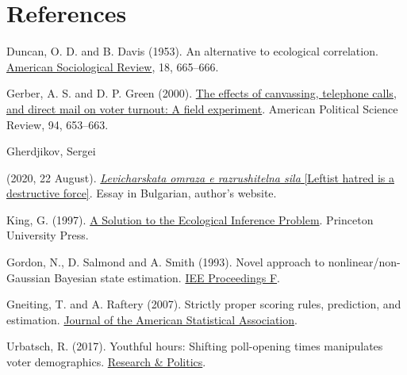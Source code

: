 \documentclass[11pt,a4paper]{article}
\begin{document}
\section*{References}
\begingroup\setlength{\parindent}{0pt}
Duncan, O. D. and B. Davis (1953). An alternative to ecological correlation. \href{https://doi.org/10.2307/2088122}{American Sociological Review}, 18, 665--666.\par
Gerber, A. S. and D. P. Green (2000). \href{https://isps.yale.edu/resource/the-effects-of-canvassing-telephone-calls-and-direct-mail-on-voter-turnout-a-field}{The effects of canvassing, telephone calls, and direct mail on voter turnout: A field experiment}. American Political Science Review, 94, 653--663.\par
\hypertarget{ref-gherdjikov}{Gherdjikov, Sergei} (2020, 22 August). \href{https://www.gherdjikov.com/levicharskata-omraza-e-razrushitelna-sila/}{\textit{Levicharskata omraza e razrushitelna sila} [Leftist hatred is a destructive force]}. Essay in Bulgarian, author's website.\par
King, G. (1997). \href{https://gking.harvard.edu/ei}{A Solution to the Ecological Inference Problem}. Princeton University Press.\par
Gordon, N., D. Salmond and A. Smith (1993). Novel approach to nonlinear/non-Gaussian Bayesian state estimation. \href{https://doi.org/10.1049/ip-f-2.1993.0015}{IEE Proceedings F}.\par
Gneiting, T. and A. Raftery (2007). Strictly proper scoring rules, prediction, and estimation. \href{https://doi.org/10.1198/016214506000001437}{Journal of the American Statistical Association}.\par
Urbatsch, R. (2017). Youthful hours: Shifting poll-opening times manipulates voter demographics. \href{https://doi.org/10.1177/2053168017720590}{Research \& Politics}.
\par\endgroup
\end{document}
